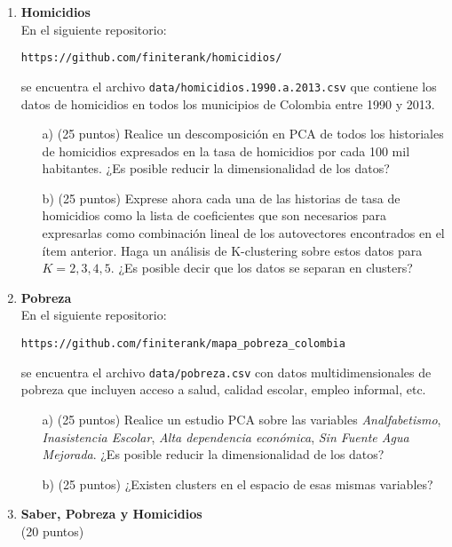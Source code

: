 \documentclass{article}
\begin{document}
\begin{enumerate}
\item
{\bf Homicidios}\\

En el siguiente repositorio:

\verb"https://github.com/finiterank/homicidios/"

se encuentra el archivo \verb"data/homicidios.1990.a.2013.csv" que contiene
los datos de homicidios en todos los municipios de Colombia entre 1990
y 2013.

\begin{itemize}
\item[a)] (25 puntos) Realice un descomposici\'on en PCA de todos los
  historiales de homicidios expresados en la tasa de homicidios por
  cada 100 mil habitantes. ¿Es posible reducir la dimensionalidad de
  los datos?  

\item[b)] (25 puntos) Exprese ahora cada una de las historias de tasa de
  homicidios como la lista de coeficientes que son necesarios
  para expresarlas como combinación lineal de los autovectores
  encontrados en el ítem anterior. Haga un análisis de K-clustering
  sobre estos datos para $K=2,3,4,5$. ¿Es posible decir que los datos
  se separan en clusters? 
\end{itemize}




\item 
{\bf Pobreza}\\
En el siguiente repositorio:

\verb"https://github.com/finiterank/mapa_pobreza_colombia"

se encuentra el archivo \verb"data/pobreza.csv" con datos
multidimensionales de pobreza que incluyen acceso a salud, calidad
escolar, empleo informal, etc.

\begin{itemize}
  \item[a)] (25 puntos) Realice un estudio PCA sobre las variables
    \emph{Analfabetismo},
    \emph{Inasistencia Escolar}, \emph{Alta dependencia econ\'omica},
    \emph{Sin Fuente Agua Mejorada}. ¿Es posible reducir la
    dimensionalidad de los datos?
  \item[b)] (25 puntos) ¿Existen clusters en el espacio de esas mismas
    variables? 
\end{itemize}


\item 
{\bf Saber, Pobreza y Homicidios}\\
(20 puntos)


\end{enumerate}
\end{document}
